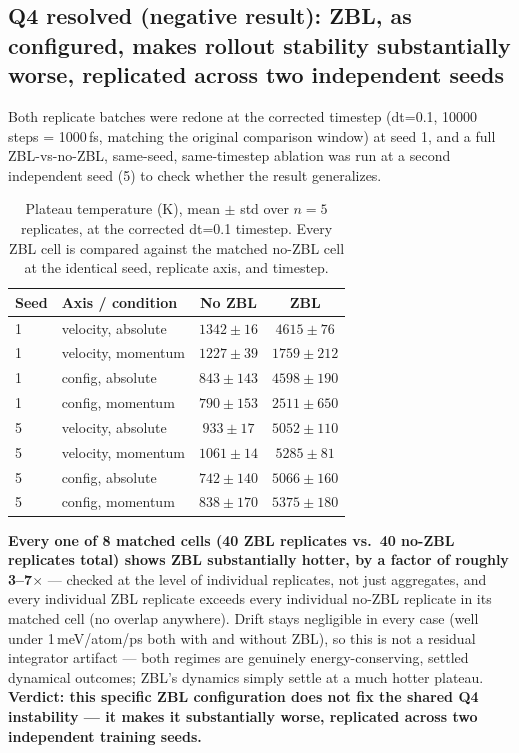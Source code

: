 \documentclass[11pt]{article}
\begin{document}
\subsection{Q4 resolved (negative result): ZBL, as configured, makes rollout
stability substantially worse, replicated across two independent seeds}
\label{sec:q4-negative-result}

Both replicate batches were redone at the corrected timestep
(dt=0.1, 10000 steps = 1000\,fs, matching the original comparison window) at
seed 1, and a full ZBL-vs-no-ZBL, same-seed, same-timestep ablation was run
at a second independent seed (5) to check whether the result generalizes.

\begin{table}[h]
\centering
\caption{Plateau temperature (K), mean $\pm$ std over $n=5$ replicates, at
the corrected dt=0.1 timestep. Every ZBL cell is compared against the
matched no-ZBL cell at the identical seed, replicate axis, and timestep.}
\label{tab:zbl-negative-result}
\begin{tabular}{llcc}
\toprule
Seed & Axis / condition & No ZBL & ZBL \\
\midrule
1 & velocity, absolute          & $1342 \pm 16$  & $4615 \pm 76$ \\
1 & velocity, momentum          & $1227 \pm 39$  & $1759 \pm 212$ \\
1 & config, absolute            & $843 \pm 143$  & $4598 \pm 190$ \\
1 & config, momentum            & $790 \pm 153$  & $2511 \pm 650$ \\
5 & velocity, absolute          & $933 \pm 17$   & $5052 \pm 110$ \\
5 & velocity, momentum          & $1061 \pm 14$  & $5285 \pm 81$ \\
5 & config, absolute            & $742 \pm 140$  & $5066 \pm 160$ \\
5 & config, momentum            & $838 \pm 170$  & $5375 \pm 180$ \\
\bottomrule
\end{tabular}
\end{table}

\textbf{Every one of 8 matched cells (40 ZBL replicates vs.\ 40 no-ZBL
replicates total) shows ZBL substantially hotter, by a factor of roughly
3--7$\times$} --- checked at the level of individual replicates, not just
aggregates, and every individual ZBL replicate exceeds every individual
no-ZBL replicate in its matched cell (no overlap anywhere). Drift stays
negligible in every case (well under 1\,meV/atom/ps both with and without
ZBL), so this is not a residual integrator artifact --- both regimes are
genuinely energy-conserving, settled dynamical outcomes; ZBL's dynamics
simply settle at a much hotter plateau. \textbf{Verdict: this specific ZBL
configuration does not fix the shared Q4 instability --- it makes it
substantially worse, replicated across two independent training seeds.}
\end{document}
